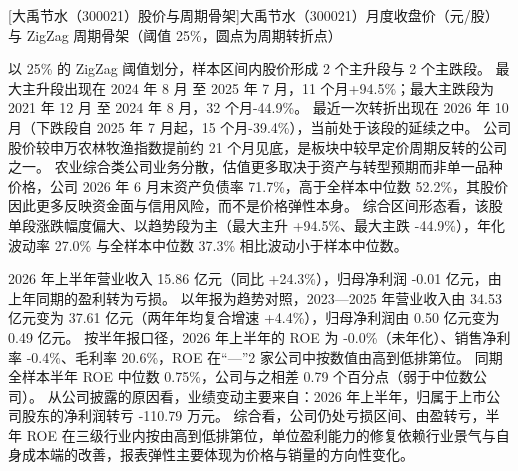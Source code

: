 \begin{center}
\begin{minipage}{\textwidth}\centering
{}

[大禹节水（300021）股价与周期骨架]{大禹节水（300021）月度收盘价（元/股）与 ZigZag 周期骨架（阈值 25\%，圆点为周期转折点）}
\end{minipage}
\end{center}

 以 25\% 的 ZigZag 阈值划分，样本区间内股价形成 2 个主升段与 2 个主跌段。 最大主升段出现在 2024 年 8 月 至 2025 年 7 月，11 个月+94.5\%；最大主跌段为 2021 年 12 月 至 2024 年 8 月，32 个月-44.9\%。 最近一次转折出现在 2026 年 10 月（下跌段自 2025 年 7 月起，15 个月-39.4\%），当前处于该段的延续之中。 公司股价较申万农林牧渔指数提前约 21 个月见底，是板块中较早定价周期反转的公司之一。 农业综合类公司业务分散，估值更多取决于资产与转型预期而非单一品种价格，公司 2026 年 6 月末资产负债率 71.7\%，高于全样本中位数 52.2\%，其股价因此更多反映资金面与信用风险，而不是价格弹性本身。 综合区间形态看，该股单段涨跌幅度偏大、以趋势段为主（最大主升 +94.5\%、最大主跌 -44.9\%），年化波动率 27.0\% 与全样本中位数 37.3\% 相比波动小于样本中位数。

 2026 年上半年营业收入 15.86 亿元（同比 +24.3\%），归母净利润 -0.01 亿元，由上年同期的盈利转为亏损。 以年报为趋势对照，2023---2025 年营业收入由 34.53 亿元变为 37.61 亿元（两年年均复合增速 +4.4\%），归母净利润由 0.50 亿元变为 0.49 亿元。 按半年报口径，2026 年上半年的 ROE 为 -0.0\%（未年化）、销售净利率 -0.4\%、毛利率 20.6\%，ROE 在“—”2 家公司中按数值由高到低排第位。 同期全样本半年 ROE 中位数 0.75\%，公司与之相差 0.79 个百分点（弱于中位数公司）。 从公司披露的原因看，业绩变动主要来自：2026 年上半年，归属于上市公司股东的净利润转亏 -110.79 万元。 综合看，公司仍处亏损区间、由盈转亏，半年 ROE 在三级行业内按由高到低排第位，单位盈利能力的修复依赖行业景气与自身成本端的改善，报表弹性主要体现为价格与销量的方向性变化。

